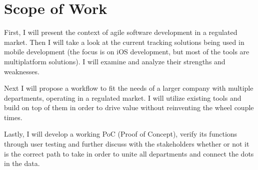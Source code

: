 \section{Scope of Work}

First, I will present the context of agile software development in a regulated market. Then I will take a look at the current tracking solutions being used in mobile development (the focus is on iOS development, but most of the tools are multiplatform solutions). I will examine and analyze their strengths and weaknesses. 

Next I will propose a workflow to fit the needs of a larger company with multiple departments, operating in a regulated market. I will utilize existing tools and build on top of them in order to drive value without reinventing the wheel couple times.

Lastly, I will develop a working PoC (Proof of Concept), verify its functions through user testing and further discuss with the stakeholders whether or not it is the correct path to take in order to unite all departments and connect the dots in the data.